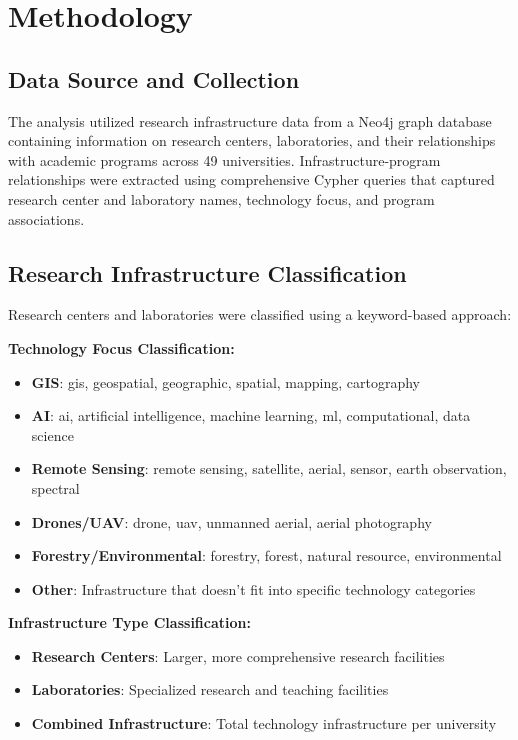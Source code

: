 \documentclass[12pt]{article}
\begin{document}
\section{Methodology}

\subsection{Data Source and Collection}
The analysis utilized research infrastructure data from a Neo4j graph database containing information on research centers, laboratories, and their relationships with academic programs across 49 universities. Infrastructure-program relationships were extracted using comprehensive Cypher queries that captured research center and laboratory names, technology focus, and program associations.

\subsection{Research Infrastructure Classification}
Research centers and laboratories were classified using a keyword-based approach:

\textbf{Technology Focus Classification:}
\begin{itemize}
    \item \textbf{GIS}: gis, geospatial, geographic, spatial, mapping, cartography
    \item \textbf{AI}: ai, artificial intelligence, machine learning, ml, computational, data science
    \item \textbf{Remote Sensing}: remote sensing, satellite, aerial, sensor, earth observation, spectral
    \item \textbf{Drones/UAV}: drone, uav, unmanned aerial, aerial photography
    \item \textbf{Forestry/Environmental}: forestry, forest, natural resource, environmental
    \item \textbf{Other}: Infrastructure that doesn't fit into specific technology categories
\end{itemize}

\textbf{Infrastructure Type Classification:}
\begin{itemize}
    \item \textbf{Research Centers}: Larger, more comprehensive research facilities
    \item \textbf{Laboratories}: Specialized research and teaching facilities
    \item \textbf{Combined Infrastructure}: Total technology infrastructure per university
\end{itemize}
\end{document}
